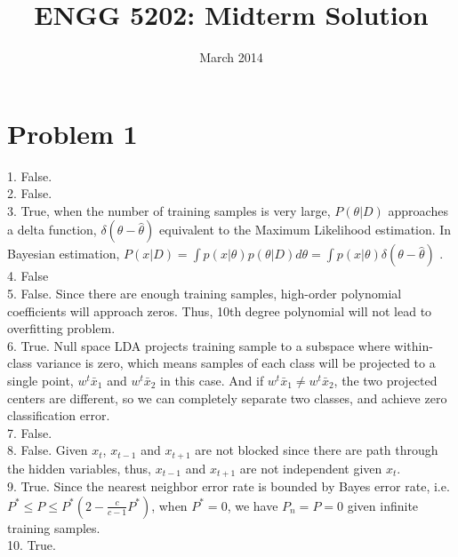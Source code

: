 \documentclass{article}
\title{ENGG 5202: Midterm Solution}
\date{March 2014}
\begin{document}
\maketitle

\section{Problem 1}
1. False. \\
2. False. \\
3. True, when the number of training samples is very large, $P(\theta | D)$ approaches a delta function, $\delta(\theta - \hat{\theta})$ equivalent to the Maximum Likelihood estimation. In Bayesian estimation, $P(x|D) = \int{p(x|\theta)p(\theta|D)} d\theta = \int{p(x|\theta)\delta(\theta - \hat{\theta})}$ .\\
4. False \\
5. False. Since there are enough training samples, high-order polynomial coefficients will approach zeros. Thus, 10th degree polynomial will not lead to overfitting problem. \\
6. True. Null space LDA projects training sample to a subspace where within-class variance is zero, which means samples of each class will be projected to a single point, $w^t\bar{x}_1$ and $w^t\bar{x}_2$ in this case. And if $w^t\bar{x}_1 \neq w^t\bar{x}_2$, the two projected centers are different, so we can completely separate two classes, and achieve zero classification error. \\
7. False. \\
8. False. Given $x_t$, $x_{t-1}$ and $x_{t+1}$ are not blocked since there are path through the hidden variables, thus, $x_{t-1}$ and $x_{t+1}$ are not independent given $x_t$.\\
9. True. Since the nearest neighbor error rate is bounded by Bayes error rate, i.e. $P^* \leq P \leq P^*(2- \frac{c}{c-1}P^*)$, when $P^* = 0$, we have $P_n = P = 0$ given infinite training samples.\\
10. True. 
\end{document}
